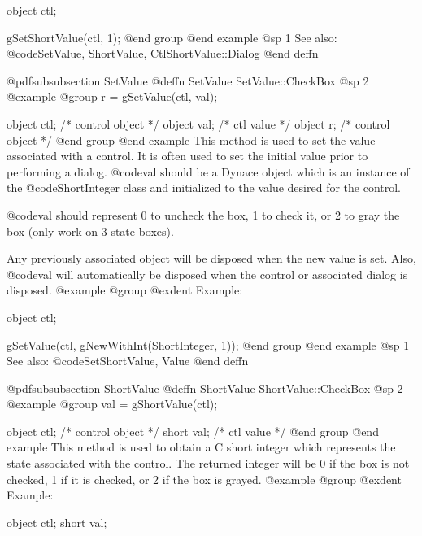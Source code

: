 object  ctl;

gSetShortValue(ctl, 1);
@end group
@end example
@sp 1
See also:  @code{SetValue, ShortValue, CtlShortValue::Dialog}
@end deffn
















@pdfsubsubsection {SetValue}
@deffn {SetValue} SetValue::CheckBox
@sp 2
@example
@group
r = gSetValue(ctl, val);

object  ctl;    /*  control object  */
object  val;    /*  ctl value       */
object  r;      /*  control object  */
@end group
@end example
This method is used to set the value associated with a control.  It is
often used to set the initial value prior to performing a dialog.
@code{val} should be a Dynace object which is an instance of the
@code{ShortInteger} class and initialized to the value desired for the
control.

@code{val} should represent 0 to uncheck the box, 1 to check it, or 2 to
gray the box (only work on 3-state boxes).

Any previously associated object will be disposed when the new value is set.
Also, @code{val} will automatically be disposed when the control or associated
dialog is disposed.
@example
@group
@exdent Example:

object  ctl;

gSetValue(ctl, gNewWithInt(ShortInteger, 1));
@end group
@end example
@sp 1
See also:  @code{SetShortValue, Value}
@end deffn













@pdfsubsubsection {ShortValue}
@deffn {ShortValue} ShortValue::CheckBox
@sp 2
@example
@group
val = gShortValue(ctl);

object  ctl;   /*  control object  */
short   val;   /*  ctl value       */
@end group
@end example
This method is used to obtain a C short integer which represents the
state associated with the control.  The returned integer will be 0 if
the box is not checked, 1 if it is checked, or 2 if the box is grayed.
@example
@group
@exdent Example:

object  ctl;
short   val;

